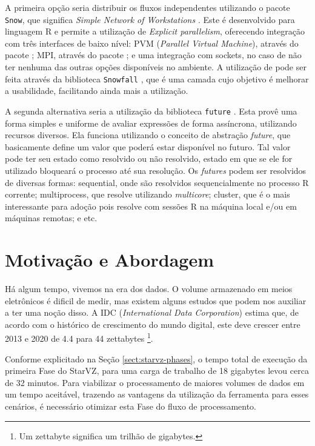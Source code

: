 A primeira opção seria distribuir os fluxos independentes utilizando o pacote 
\texttt{Snow}, que significa \textit{Simple Network of Workstations} 
\cite{ref:snow}. Este é desenvolvido para linguagem R e permite a utilização
de \textit{Explicit parallelism}, oferecendo integração com três interfaces de 
baixo nível: PVM (\textit{Parallel Virtual Machine}), através do pacote 
; MPI, através do pacote  \cite{ref:rmpi}; e uma 
integração com sockets, no caso de não ter nenhuma das outras opções disponíveis 
no ambiente. A utilização de  pode ser feita através da 
biblioteca \texttt{Snowfall} \cite{ref:snowfall}, que é uma camada cujo objetivo 
é melhorar a usabilidade, 
facilitando ainda mais a utilização.

A segunda alternativa seria a utilização da biblioteca \texttt{future} 
\cite{ref:future}. Esta provê uma forma simples e uniforme de avaliar expressões 
de forma assíncrona, utilizando recursos diversos. Ela funciona utilizando o 
conceito de abstração \textit{future}, que basicamente define um valor que 
poderá 
estar disponível no futuro. Tal valor pode ter seu estado como resolvido ou não 
resolvido, estado em que se ele for utilizado bloqueará o processo até sua 
resolução. Os \textit{futures} podem ser resolvidos de diversas formas: 
sequential, onde são resolvidos sequencialmente no processo R corrente; 
multiprocess, que resolve utilizando \textit{multicore}; cluster, que é o mais 
interessante para adoção pois resolve com sessões R na máquina local e/ou em 
máquinas remotas; e etc.

\section{Motivação e Abordagem}\label{sect:motivation}

Há algum tempo, vivemos na era dos dados. O volume armazenado em meios 
eletrônicos é dificil de medir, mas existem alguns estudos que podem nos 
auxiliar a ter uma noção disso. A IDC (\textit{International Data Corporation}) 
\cite{ref:idcdigitaluniverse} estima que, de acordo com o histórico de 
crescimento do mundo digital, este deve crescer entre 2013 e 2020 de 4.4 para 44 
zettabytes \footnote{Um zettabyte significa um trilhão de gigabytes.}.

Conforme explicitado na Seção \ref{sect:starvz-phases}, o tempo total de 
execução da primeira Fase do StarVZ, para uma carga de trabalho de 18 gigabytes 
levou cerca de 32 minutos. Para viabilizar o processamento de maiores volumes de 
dados em um tempo aceitável, trazendo as vantagens da utilização da ferramenta 
para esses cenários, é necessário otimizar esta Fase do fluxo de processamento.

